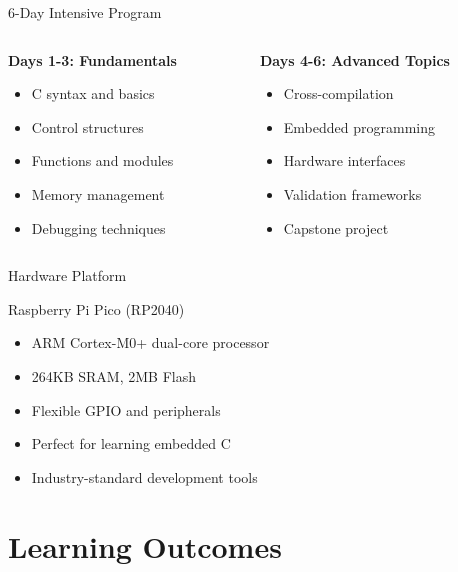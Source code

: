 \documentclass[aspectratio=169]{beamer}
\begin{document}
\begin{frame}{6-Day Intensive Program}
  \begin{columns}
    \begin{column}{0.5\textwidth}
      \textbf{Days 1-3: Fundamentals}
      \begin{itemize}
        \item C syntax and basics
        \item Control structures
        \item Functions and modules
        \item Memory management
        \item Debugging techniques
      \end{itemize}
    \end{column}
    \begin{column}{0.5\textwidth}
      \textbf{Days 4-6: Advanced Topics}
      \begin{itemize}
        \item Cross-compilation
        \item Embedded programming
        \item Hardware interfaces
        \item Validation frameworks
        \item Capstone project
      \end{itemize}
    \end{column}
  \end{columns}
\end{frame}

\begin{frame}{Hardware Platform}
  \begin{exampleblock}{Raspberry Pi Pico (RP2040)}
    \begin{itemize}
      \item ARM Cortex-M0+ dual-core processor
      \item 264KB SRAM, 2MB Flash
      \item Flexible GPIO and peripherals
      \item Perfect for learning embedded C
      \item Industry-standard development tools
    \end{itemize}
  \end{exampleblock}
\end{frame}

\section{Learning Outcomes}
\end{document}
